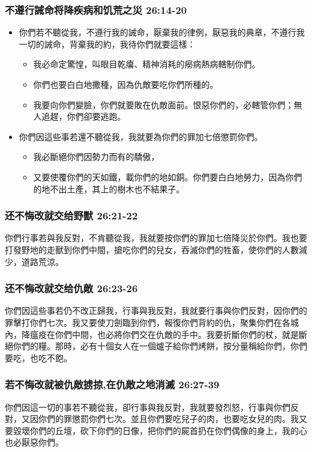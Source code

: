 \subsubsection{不遵行誡命将降疾病和饥荒之災 26:14-20}
\begin{itemize} 
\itemsep-.35em
\item 你們若不聽從我，不遵行我的誡命，厭棄我的律例，厭惡我的典章，不遵行我一切的誡命，背棄我的約，我待你們就要這樣：
\begin{itemize} 
\itemsep-.35em
\item 我必命定驚惶，叫眼目乾癟、精神消耗的癆病熱病轄制你們。
\item 你們也要白白地撒種，因為仇敵要吃你們所種的。
\item 我要向你們變臉，你們就要敗在仇敵面前。恨惡你們的，必轄管你們；無人追趕，你們卻要逃跑。
\end{itemize}
\item 你們因這些事若還不聽從我，我就要為你們的罪加七倍懲罰你們。
\begin{itemize} 
\itemsep-.35em
\item 我必斷絕你們因勢力而有的驕傲，
\item 又要使覆你們的天如鐵，載你們的地如銅。你們要白白地勞力，因為你們的地不出土產，其上的樹木也不結果子。
\end{itemize}
\end{itemize}

\subsubsection{还不悔改就交给野獸 26:21-22}
你們行事若與我反對，不肯聽從我，我就要按你們的罪加七倍降災於你們。我也要打發野地的走獸到你們中間，搶吃你們的兒女，吞滅你們的牲畜，使你們的人數減少，道路荒涼。

\subsubsection{还不悔改就交给仇敵 26:23-26}
你們因這些事若仍不改正歸我，行事與我反對，我就要行事與你們反對，因你們的罪擊打你們七次。我又要使刀劍臨到你們，報復你們背約的仇，聚集你們在各城內，降瘟疫在你們中間，也必將你們交在仇敵的手中。我要折斷你們的杖，就是斷絕你們的糧。那時，必有十個女人在一個爐子給你們烤餅，按分量稱給你們，你們要吃，也吃不飽。

\subsubsection{若不悔改就被仇敵掳掠,在仇敵之地消滅 26:27-39}
你們因這一切的事若不聽從我，卻行事與我反對，我就要發烈怒，行事與你們反對，又因你們的罪懲罰你們七次。並且你們要吃兒子的肉，也要吃女兒的肉。我又要毀壞你們的丘壇，砍下你們的日像，把你們的屍首扔在你們偶像的身上，我的心也必厭惡你們。

